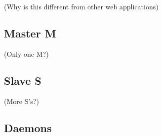 (Why is this different from other web applications)

\subsection{Master M}

(Only one M?)

\subsection{Slave S}

(More S's?)

\subsection{Daemons}

